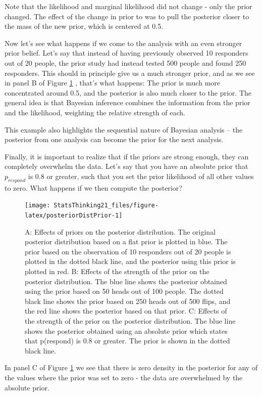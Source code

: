 \documentclass[12pt,]{book}
\theoremstyle{definition}
\theoremstyle{definition}
\theoremstyle{definition}
\theoremstyle{remark}
\begin{document}
Note that the likelihood and marginal likelihood did not change - only the prior changed. The effect of the change in prior to was to pull the posterior closer to the mass of the new prior, which is centered at 0.5.

Now let's see what happens if we come to the analysis with an even stronger prior belief. Let's say that instead of having previously observed 10 responders out of 20 people, the prior study had instead tested 500 people and found 250 responders. This should in principle give us a much stronger prior, and as we see in panel B of Figure \ref{fig:posteriorDistPrior} , that's what happens: The prior is much more concentrated around 0.5, and the posterior is also much closer to the prior. The general idea is that Bayesian inference combines the information from the prior and the likelihood, weighting the relative strength of each.

This example also highlights the sequential nature of Bayesian analysis -- the posterior from one analysis can become the prior for the next analysis.

Finally, it is important to realize that if the priors are strong enough, they can completely overwhelm the data. Let's say that you have an absolute prior that \(p_{respond}\) is 0.8 or greater, such that you set the prior likelihood of all other values to zero. What happens if we then compute the posterior?

\begin{figure}
\texttt{[image: StatsThinking21\_files/figure-latex/posteriorDistPrior-1]} \caption{A: Effects of priors on the posterior distribution.  The original posterior distribution based on a flat prior is plotted in blue. The prior based on the observation of 10 responders out of 20 people is plotted in the dotted black line, and the posterior using this prior is plotted in red.  B: Effects of the strength of the prior on the posterior distribution. The blue line shows the posterior obtained using the prior based on 50 heads out of 100 people.  The dotted black line shows the prior based on 250 heads out of 500 flips, and the red line shows the posterior based on that prior. C: Effects of the strength of the prior on the posterior distribution. The blue line shows the posterior obtained using an absolute prior which states that p(respond) is 0.8 or greater.  The prior is shown in the dotted black line.}\label{fig:posteriorDistPrior}
\end{figure}

In panel C of Figure \ref{fig:posteriorDistPrior} we see that there is zero density in the posterior for any of the values where the prior was set to zero - the data are overwhelmed by the absolute prior.
\end{document}

